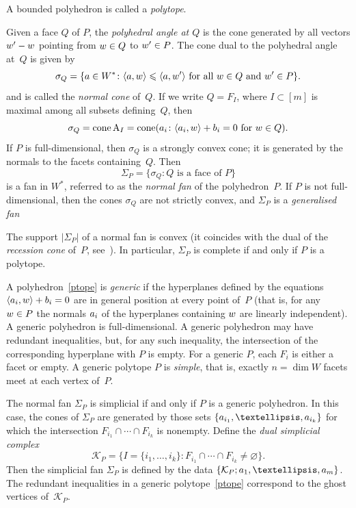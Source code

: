 \documentclass[a4paper]{amsart}
\theoremstyle{definition}
\newtheorem{construction}[theorem]{Construction}
\theoremstyle{remark}
\numberwithin{equation}{section}
\newcommand{\mb}[1]{{\textbf {\textit#1}}}
\renewcommand{\le}{\leqslant}
\def\cone{\mathop{\mathrm{cone}}}
\newcommand{\<}{\langle}
\renewcommand{\>}{\rangle}
\begin{document}
A bounded polyhedron is called a \emph{polytope}.

Given a face $Q$ of $P$, the \emph{polyhedral angle at $Q$} is the cone generated by all vectors ${\mb w'-\mb w}$ pointing from $\mb w\in Q$ to $\mb w'\in P$. The cone dual to the polyhedral angle at~$Q$ is given by
\[
  \sigma_Q=\{\mb a\in W^*\colon
  \langle\mb a,\mb w\rangle\le\langle\mb a,\mb w'\rangle
  \text{ for all $\mb w\in Q$ and $\mb w'\in P$}\}.
\]
and is called the \emph{normal cone} of~$Q$. 
If we write $Q=F_I$, where $I\subset[m]$ is maximal among all subsets defining~$Q$, then
\begin{equation}\label{sigmaQAI}
  \sigma_Q=\cone\mathrm A_I=\cone(\mb a_i\colon 
  \langle\mb a_i,\mb w\rangle+b_i=0\text{ for }\mb w\in Q).
\end{equation}
If $P$ is full-dimensional, then $\sigma_Q$ is a strongly convex cone; it is generated by the normals to the facets containing~$Q$.  Then
\[
  \Sigma_P=\{\sigma_Q\colon Q\text{ is a face of }P\}
\]
is a fan in $W^*$, referred to as the \emph{normal fan} of the polyhedron~$P$. If $P$ is not full-dimensional, then the cones $\sigma_Q$ are not strictly convex, and $\Sigma_P$ is a \emph{generalised fan}~\cite[Definition~6.2.2]{c-l-s11}

The support $|\Sigma_P|$ of a normal fan is convex (it coincides with the dual of the \emph{recession cone} of~$P$, see~\cite[Theorem~7.1.6]{c-l-s11}). In particular, $\Sigma_P$ is complete if and only if $P$ is a polytope.

\medskip

A polyhedron~\eqref{ptope} is \emph{generic} if the hyperplanes defined by the equations $\langle\mb a_i,\mb w\rangle+b_i=0$ are
in general position at every point of~$P$ (that is, for any $\mb
w\in P$ the normals $\mb a_i$ of the hyperplanes containing
$\mb w$ are linearly independent). A generic polyhedron is full-dimensional. A generic polyhedron may have redundant inequalities, but,
for any such inequality, the intersection of the corresponding
hyperplane with $P$ is empty. For a generic $P$, each $F_i$ is either a facet or empty. A generic polytope $P$ is \emph{simple}, that is, exactly $n=\dim W$ facets meet at each vertex of~$P$.

The normal fan $\Sigma_P$ is simplicial if and only if $P$ is a generic polyhedron. In this case, the cones of $\Sigma_P$ are generated by those sets $\{\mb a_{i_1},\ldots,\mb
a_{i_k}\}$ for which the intersection $F_{i_1}\cap\cdots\cap
F_{i_k}$ is nonempty. Define the \emph{dual simplicial complex}
\[
  \mathcal K_P=\bigl\{I=\{i_1,\ldots,i_k\}\colon F_{i_1}\cap\cdots\cap
  F_{i_k}\ne\varnothing \bigr\}.
\]
Then the simplicial fan $\Sigma_P$ is defined by the data $\{\mathcal K_P;\mb a_1,\ldots,\mb a_m\}$. The redundant inequalities in a generic polytope~\eqref{ptope} correspond to the ghost vertices of~$\mathcal K_P$. 
\end{document}
